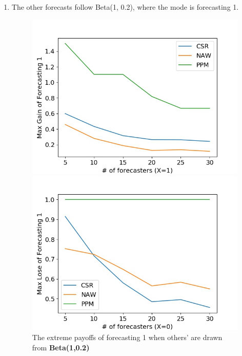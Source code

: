 \documentclass[english,10pt]{article}
\begin{document}
\begin{enumerate}
	\item The other forecasts follow Beta(1, 0.2), where the mode is forecasting 1.
	\begin{figure}[H]
        	\centering
        	\begin{minipage}{0.48\textwidth}
        	\includegraphics[width = \textwidth]{(Beta(1_0dot2)F_UnifW)Max_gain_of_forecasting_1.jpg}
        	\end{minipage}
        	\begin{minipage}{0.48\textwidth}
        	\includegraphics[width = \textwidth]{(Beta(1_0dot2)F_UnifW)Max_lose_of_forecasting_1.jpg}
        	\end{minipage}
        	\caption{The  extreme payoffs of forecasting 1 when others' are drawn from \textbf{Beta(1,0.2)}}
        	\end{figure}
	

\end{enumerate}
\end{document}
